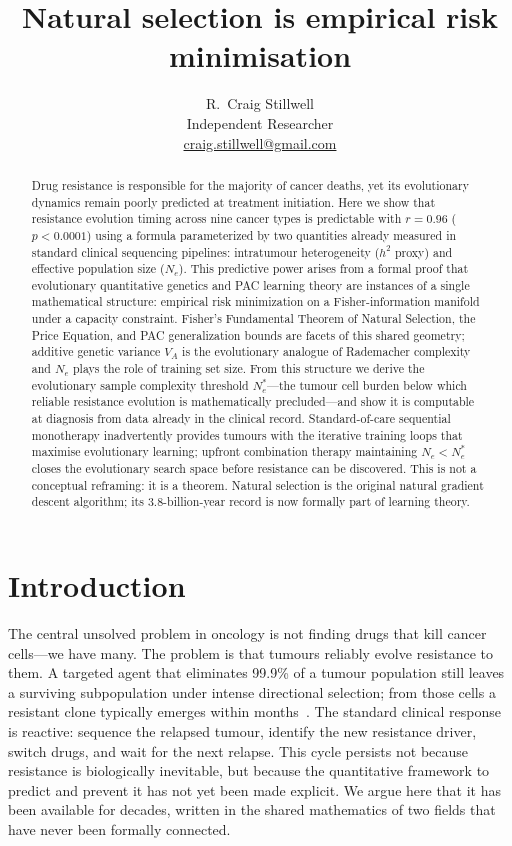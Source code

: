 \documentclass[12pt]{article}
\title{Natural selection is empirical risk minimisation}
\author{R.\ Craig Stillwell\\[0.4em]
\small Independent Researcher\\
\small \href{mailto:craig.stillwell@gmail.com}{craig.stillwell@gmail.com}}
\date{}
\theoremstyle{remark}
\begin{document}
\maketitle

\begin{abstract}
Drug resistance is responsible for the majority of cancer deaths, yet its evolutionary dynamics remain poorly predicted at treatment initiation. Here we show that resistance evolution timing across nine cancer types is predictable with $r = 0.96$ ($p < 0.0001$) using a formula parameterized by two quantities already measured in standard clinical sequencing pipelines: intratumour heterogeneity ($h^2$ proxy) and effective population size ($N_e$). This predictive power arises from a formal proof that evolutionary quantitative genetics and PAC learning theory are instances of a single mathematical structure: empirical risk minimization on a Fisher-information manifold under a capacity constraint. Fisher's Fundamental Theorem of Natural Selection, the Price Equation, and PAC generalization bounds are facets of this shared geometry; additive genetic variance $V_A$ is the evolutionary analogue of Rademacher complexity and $N_e$ plays the role of training set size. From this structure we derive the evolutionary sample complexity threshold $N_e^*$---the tumour cell burden below which reliable resistance evolution is mathematically precluded---and show it is computable at diagnosis from data already in the clinical record. Standard-of-care sequential monotherapy inadvertently provides tumours with the iterative training loops that maximise evolutionary learning; upfront combination therapy maintaining $N_e < N_e^*$ closes the evolutionary search space before resistance can be discovered. This is not a conceptual reframing: it is a theorem. Natural selection is the original natural gradient descent algorithm; its 3.8-billion-year record is now formally part of learning theory.
\end{abstract}

\section{Introduction}

The central unsolved problem in oncology is not finding drugs that kill cancer cells---we have many. The problem is that tumours reliably evolve resistance to them. A targeted agent that eliminates 99.9\% of a tumour population still leaves a surviving subpopulation under intense directional selection; from those cells a resistant clone typically emerges within months~\cite{williams2016,abbosh2023}. The standard clinical response is reactive: sequence the relapsed tumour, identify the new resistance driver, switch drugs, and wait for the next relapse. This cycle persists not because resistance is biologically inevitable, but because the quantitative framework to predict and prevent it has not yet been made explicit. We argue here that it has been available for decades, written in the shared mathematics of two fields that have never been formally connected.
\end{document}
